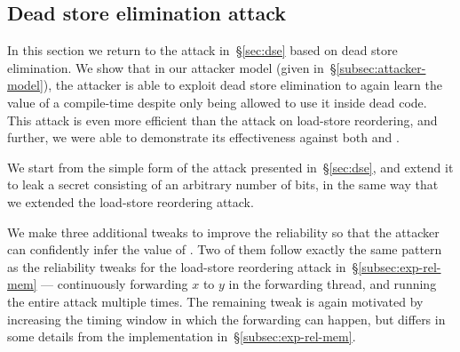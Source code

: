 \subsection{Dead store elimination attack}
\label{subsec:exp-dse}

In this section we return to the attack in~\S\ref{sec:dse} based on
dead store elimination.
We show that in our attacker model (given in~\S\ref{subsec:attacker-model}),
the attacker is able to exploit dead
store elimination to again learn the value of a compile-time {\SEC}
despite only being allowed to use it inside dead code.
This attack is even more efficient than the attack on load-store reordering,
and further, we were able to demonstrate its effectiveness against both
{\GCC} and {\CLANG}.

We start from the simple form of the attack presented in~\S\ref{sec:dse},
and extend it to leak a secret consisting of an
arbitrary number of bits, in the same way that we extended the load-store
reordering attack.
We make three additional tweaks to improve the reliability so that the attacker
can confidently infer the value of {\SEC}.
Two of them follow exactly the same pattern as the reliability tweaks
for the load-store reordering attack in~\S\ref{subsec:exp-rel-mem} ---
continuously forwarding $x$ to $y$ in the forwarding thread, and running the
entire attack multiple times.
The remaining tweak is again motivated by increasing the timing window in
which the forwarding can happen, but differs in some details from the
implementation in~\S\ref{subsec:exp-rel-mem}.

